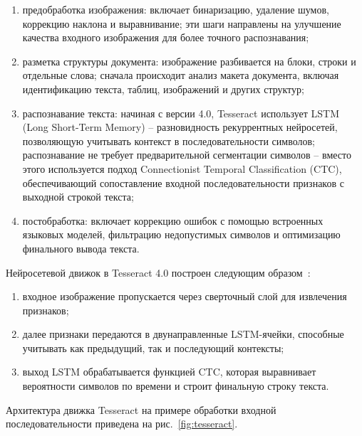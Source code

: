 \begin{enumerate}
    \item предобработка изображения: включает бинаризацию, удаление шумов, 
    коррекцию наклона и выравнивание; эти шаги направлены на улучшение качества 
    входного изображения для более точного распознавания;
    \item разметка структуры документа: изображение разбивается на блоки, строки 
    и отдельные слова; сначала происходит анализ макета документа, включая 
    идентификацию текста, таблиц, изображений и других структур;
    \item распознавание текста: начиная с версии 4.0, Tesseract использует LSTM 
    (Long Short-Term Memory) -- разновидность рекуррентных нейросетей, 
    позволяющую учитывать контекст в последовательности символов; распознавание 
    не требует предварительной сегментации символов -- вместо этого используется 
    подход Connectionist Temporal Classification (CTC), обеспечивающий 
    сопоставление входной последовательности признаков с выходной строкой текста;
    \item постобработка: включает коррекцию ошибок с помощью встроенных языковых 
    моделей, фильтрацию недопустимых символов и оптимизацию финального вывода 
    текста.
\end{enumerate}

Нейросетевой движок в Tesseract 4.0 построен следующим образом~\cite{tesseract}:

\begin{enumerate}
    \item входное изображение пропускается через сверточный слой для извлечения 
    признаков;
    \item далее признаки передаются в двунаправленные LSTM-ячейки, способные 
    учитывать как предыдущий, так и последующий контексты;
    \item выход LSTM обрабатывается функцией CTC, которая выравнивает вероятности 
    символов по времени и строит финальную строку текста.
\end{enumerate}

Архитектура движка Tesseract на примере обработки входной последовательности 
приведена на рис.~\ref{fig:tesseract}.

